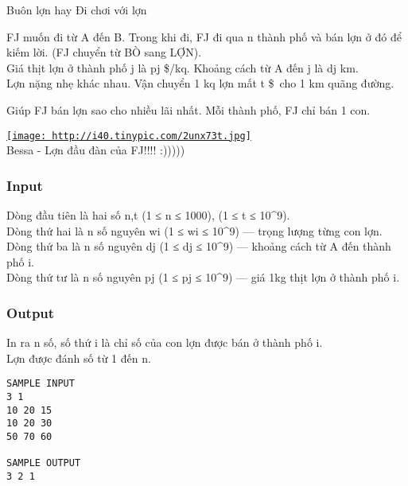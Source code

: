 

Buôn lợn hay Đi chơi với lợn

FJ muốn đi từ A đến B. Trong khi đi, FJ đi qua n thành phố và bán lợn ở đó để kiếm lời. (FJ chuyển từ BÒ sang LỢN).
\\Giá thịt lợn ở thành phố j là pj \$/kq. Khoảng cách từ A đến j là dj km.
\\Lợn nặng nhẹ khác nhau. Vận chuyển 1 kq lợn mất t \$ cho 1 km quãng đường. 

Giúp FJ bán lợn sao cho nhiều lãi nhất. Mỗi thành phố, FJ chỉ bán 1 con.

\href{http://tinypic.com}{
\texttt{[image: http://i40.tinypic.com/2unx73t.jpg]}}
\\Bessa - Lợn đầu đàn của FJ!!!! :)))))

\subsubsection{Input}

Dòng đầu tiên là hai số n,t (1 ≤ n ≤ 1000), (1 ≤ t ≤ 10\textasciicircum9).
\\Dòng thứ hai là n số nguyên wi (1 ≤ wi ≤ 10\textasciicircum9) — trọng lượng từng con lợn.
\\Dòng thứ ba là n số nguyên dj (1 ≤ dj ≤ 10\textasciicircum9) — khoảng cách từ A đến thành phố i.
\\Dòng thứ tư là n số nguyên pj (1 ≤ pj ≤ 10\textasciicircum9) — giá 1kg thịt lợn ở thành phố i.

\subsubsection{Output}

In ra n số, số thứ i là chỉ số của con lợn được bán ở thành phố i.
\\Lợn được đánh số từ 1 đến n.
\begin{verbatim}
SAMPLE INPUT
3 1
10 20 15
10 20 30
50 70 60

SAMPLE OUTPUT
3 2 1\end{verbatim}